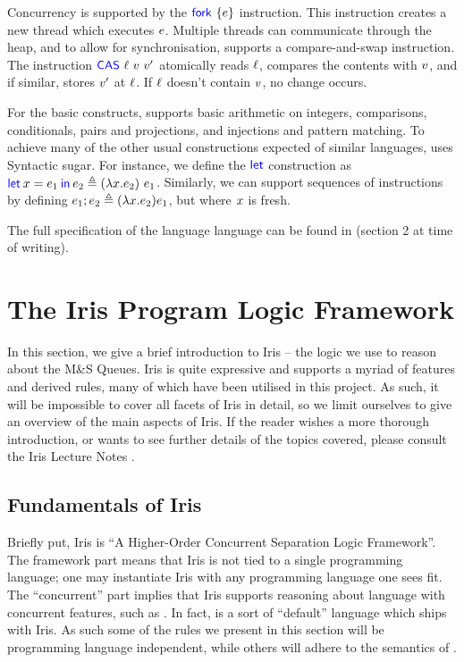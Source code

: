 \documentclass[a4paper, 10pt]{report}
\theoremstyle{definition}
\newcommand{\msq}{M\&S Queue}
\begin{document}
Concurrency is supported by the $\Fork{\expr}$ instruction. This instruction creates a new thread which executes $e$. Multiple threads can communicate through the heap, and to allow for synchronisation, \heaplang supports a compare-and-swap instruction. The instruction $\textsf{\color{blue} CAS} \ \ell \ v \ v'$ atomically reads $\ell$, compares the contents with $v$, and if similar, stores $v'$ at $\ell$. If $\ell$ doesn't contain $v$, no change occurs.

For the basic constructs, \heaplang supports basic arithmetic on integers, comparisons, conditionals, pairs and projections, and injections and pattern matching. To achieve many of the other usual constructions expected of similar languages, \heaplang uses Syntactic sugar. For instance, we define the $\textsf{\color{blue} let}$ construction as $\Let \var = \expr_1 in \expr_2 \eqdef (\lambda{} \var . \expr_2) ~ \expr_1$. Similarly, we can support sequences of instructions by defining $e_1 ; e_2 \triangleq (\lambda{} x . e_2) e_1$, but where $x$ is fresh.

The full specification of the language language can be found in \citet{gentleiris} (section 2 at time of writing).

\section{The Iris Program Logic Framework}
\label{Pre:section:iris}

In this section, we give a brief introduction to Iris -- the logic we use to reason about the \msq{}s. Iris is quite expressive and supports a myriad of features and derived rules, many of which have been utilised in this project. As such, it will be impossible to cover all facets of Iris in detail, so we limit ourselves to give an overview of the main aspects of Iris. If the reader wishes a more thorough introduction, or wants to see further details of the topics covered, please consult the Iris Lecture Notes \citep{gentleiris}.

\subsection{Fundamentals of Iris}
Briefly put, Iris is \enquote{A Higher-Order Concurrent Separation Logic Framework}. The framework part means that Iris is not tied to a single programming language; one may instantiate Iris with any programming language one sees fit. The ``concurrent'' part implies that Iris supports reasoning about language with concurrent features, such as \heaplang. In fact, \heaplang is a sort of ``default'' language which ships with Iris. As such some of the rules we present in this section will be programming language independent, while others will adhere to the semantics of \heaplang.
\end{document}
